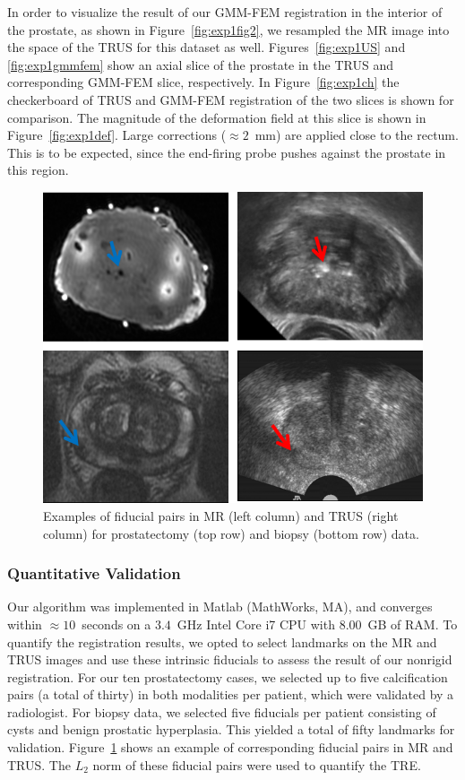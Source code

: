 \documentclass[journal]{IEEEtran}
\begin{document}
In order to visualize the result of our GMM-FEM registration in the interior of the prostate, as shown in Figure~\ref{fig:exp1fig2}, we resampled the MR image into the space of the TRUS for this dataset as well. Figures~\ref{fig:exp1US} and \ref{fig:exp1gmmfem} show an axial slice of the prostate in the TRUS and corresponding GMM-FEM slice, respectively. In Figure~\ref{fig:exp1ch} the checkerboard of TRUS and GMM-FEM registration of the two slices is shown for comparison. The magnitude of the deformation field at this slice is shown in Figure~\ref{fig:exp1def}. Large corrections ($\approx2$~mm) are applied close to the rectum. This is to be expected, since the end-firing probe pushes against the prostate in this region.
\begin{figure}[t]
	\centering
	\includegraphics[width=\columnwidth]{FiducialPair}
	\caption{Examples of fiducial pairs in MR (left column) and TRUS (right column) for prostatectomy (top row) and biopsy (bottom row) data. \label{fig:exp2fiducial1}}
\end{figure}
\subsubsection{Quantitative Validation}
Our algorithm was implemented in Matlab (MathWorks, MA), and converges within $\approx10$~seconds on a $3.4$~GHz Intel Core i7 CPU with $8.00$~GB of RAM. To quantify the registration results, we opted to select landmarks on the MR and TRUS images and use these intrinsic fiducials to assess the result of our nonrigid registration. For our ten prostatectomy cases, we selected up to five calcification pairs (a total of thirty) in both modalities per patient, which were validated by a radiologist. For biopsy data, we selected five fiducials per patient consisting of cysts and benign prostatic hyperplasia. This yielded a total of fifty landmarks for validation. Figure~\ref{fig:exp2fiducial1} shows an example of corresponding fiducial pairs in MR and TRUS. The $L_2$ norm of these fiducial pairs were used to quantify the TRE. 
\end{document}
